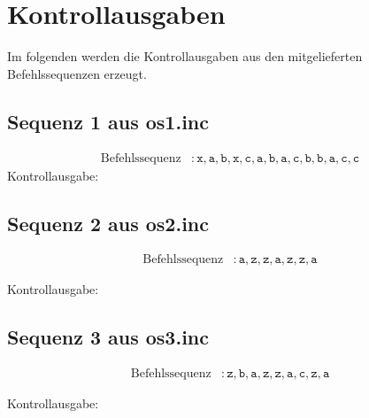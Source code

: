 \section{Kontrollausgaben}
Im folgenden werden die Kontrollausgaben aus den mitgelieferten Befehlssequenzen erzeugt.


\subsection{Sequenz 1 aus os1.inc}

\begin{align*}
\text{Befehlssequenz} &: \mathtt{x,a,b,x,c,a,b,a,c,b,b,a,c,c}
\end{align*}
Kontrollausgabe:





\subsection{Sequenz 2 aus os2.inc}
\begin{align*}
\text{Befehlssequenz} &: \mathtt{a,z,z,a,z,z,a}
\end{align*}

Kontrollausgabe:



\subsection{Sequenz 3 aus os3.inc}

\begin{align*}
\text{Befehlssequenz} &: \mathtt{z,b,a,z,z,a,c,z,a}
\end{align*}

Kontrollausgabe:
